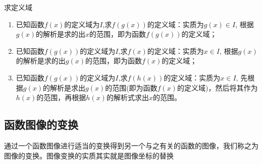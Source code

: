 \vspace{3mm}
\begin{note}
求定义域
\begin{enumerate}
\item 已知函数$f(x)$的定义域为$I$,求$f(g(x))$的定义域：实质为$g(x) \in I$, 根据$g(x)$的解析是求的出$x$的范围，即为函数$f(g(x))$的定义域；
\item 已知函数$f(g(x))$的定义域为$I$,求$f(x)$的定义域：实质为$x \in I$, 根据$g(x)$的解析是求的出$g(x)$的范围，即为函数$f(x)$的定义域；
\item 已知函数$f(g(x))$的定义域为$I$,求$f(h(x))$的定义域：实质为$x \in I$, 先根据$g(x)$的解析是求出$g(x)$的范围(即为函数$f(x)$的定义域)，然后将其作为$h(x)$的范围，再根据$h(x)$的解析式求出$x$的范围。
\end{enumerate}
\end{note}

\subsection{函数图像的变换}

通过一个函数图像进行适当的变换得到另一个与之有关的函数的图像，我们称之为图像的变换。图像变换的实质其实就是图像\textcolor{third}{坐标的替换}

